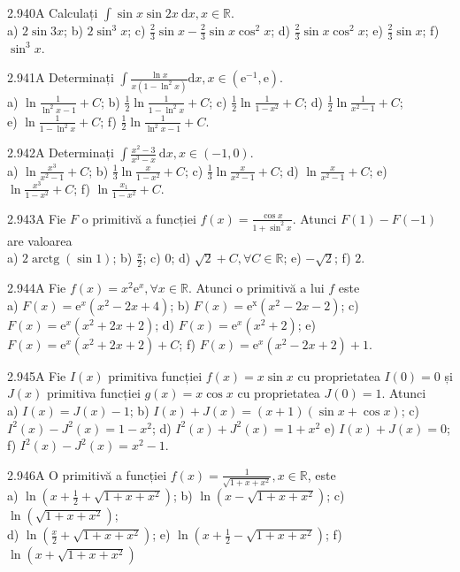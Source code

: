 \documentclass[11pt]{article}
\begin{document}
2.940A Calculați $\int \sin x \sin 2 x \mathrm{~d} x, x \in \mathbb{R}$.\\ a) $2 \sin 3 x$; b) $2 \sin ^{3} x$; c) $\frac{2}{3} \sin x-\frac{2}{3} \sin x \cos ^{2} x$; d) $\frac{2}{3} \sin x \cos ^{2} x$; e) $\frac{2}{3} \sin x$; f) $\sin ^{3} x$.

2.941A Determinați $\int \frac{\ln x}{x\left(1-\ln ^{2} x\right)} \mathrm{d} x, x \in\left(\mathrm{e}^{-1}, \mathrm{e}\right)$.\\ a) $\ln \frac{1}{\ln ^{2} x-1}+C$; b) $\frac{1}{2} \ln \frac{1}{1-\ln ^{2} x}+C$; c) $\frac{1}{2} \ln \frac{1}{1-x^{2}}+C$; d) $\frac{1}{2} \ln \frac{1}{x^{2}-1}+C$;\\ e) $\ln \frac{1}{1-\ln ^{2} x}+C$; f) $\frac{1}{2} \ln \frac{1}{\ln ^{2} x-1}+C$.

2.942A Determinați $\int \frac{x^{2}-3}{x^{3}-x} \mathrm{~d} x, x \in(-1,0)$.\\ a) $\ln \frac{x^{3}}{x^{2}-1}+C$; b) $\frac{1}{3} \ln \frac{x}{1-x^{2}}+C$; c) $\frac{1}{3} \ln \frac{x}{x^{2}-1}+C$; d) $\ln \frac{x}{x^{2}-1}+C$; e) $\ln \frac{x^{3}}{1-x^{2}}+C$; f) $\ln \frac{x_{1}}{1-x^{2}}+C$. 

2.943A Fie $F$ o primitivă a funcției $f(x)=\frac{\cos x}{1+\sin ^{2} x}$. Atunci $F(1)-F(-1)$ are valoarea\\ a) $2 \operatorname{arctg}(\sin 1)$; b) $\frac{\pi}{2}$; c) $0$; d) $\sqrt{2}+C, \forall C \in \mathbb{R}$; e) $-\sqrt{2}$; f) $2$.

2.944A Fie $f(x)=x^{2} \mathrm{e}^{x}, \forall x \in \mathbb{R}$. Atunci o primitivă a lui $f$ este\\ a) $F(x)=\mathrm{e}^{x}\left(x^{2}-2 x+4\right)$; b) $F(x)=\mathrm{e}^{\mathrm{x}}\left(x^{2}-2 x-2\right)$; c) $F(x)=\mathrm{e}^{x}\left(x^{2}+2 x+2\right)$; d) $F(x)=\mathrm{e}^{x}\left(x^{2}+2\right)$; e) $F(x)=\mathrm{e}^{x}\left(x^{2}+2 x+2\right)+C$; f) $F(x)=\mathrm{e}^{x}\left(x^{2}-2 x+2\right)+1$.

2.945A Fie $I(x)$ primitiva funcției $f(x)=x\sin x$ cu proprietatea $I(0)=0$ și $J(x)$ primitiva funcției $g(x)=x \cos x$ cu proprietatea $J(0)=1$. Atunci\\ a) $I(x)=J(x)-1$; b) $I(x)+J(x)=(x+1)(\sin x+\cos x)$; c) $I^{2}(x)-J^{2}(x)=1-x^{2}$; d) $I^{2}(x)+J^{2}(x)=1+x^{2}$ e) $I(x)+J(x)=0$; f) $I^{2}(x)-J^{2}(x)=x^{2}-1$.

2.946A O primitivă a funcției $f(x)=\frac{1}{\sqrt{1+x+x^{2}}}, x \in \mathbb{R}$, este\\ a) $\ln \left(x+\frac{1}{2}+\sqrt{1+x+x^{2}}\right)$; b) $\ln \left(x-\sqrt{1+x+x^{2}}\right)$; c) $\ln \left(\sqrt{1+x+x^{2}}\right)$;\\ d) $\ln \left(\frac{x}{2}+\sqrt{1+x+x^{2}}\right)$; e) $\ln \left(x+\frac{1}{2}-\sqrt{1+x+x^{2}}\right)$; f) $\ln \left(x+\sqrt{1+x+x^{2}}\right)$
\end{document}
